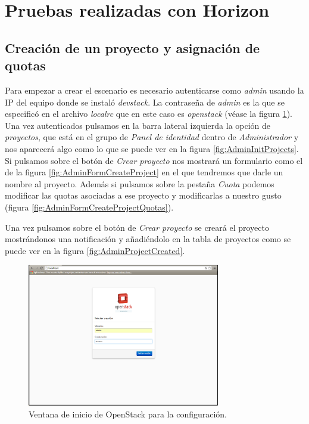 \documentclass{article}
\begin{document}
\section{Pruebas realizadas con Horizon}

\subsection{Creación de un proyecto y asignación de quotas}
	Para empezar a crear el escenario es necesario autenticarse como \emph{admin} usando la IP del equipo donde se instaló \emph{devstack}. La contraseña de \emph{admin} es la que se especificó en el archivo \emph{localrc} que en este caso es \emph{openstack} (véase la figura \ref{fig:AuthAdmin}). Una vez autenticados pulsamos en la barra lateral izquierda  la opción de \emph{proyectos}, que está en el grupo de \emph{Panel de identidad} dentro de \emph{Administrador} y nos aparecerá algo como lo que se puede ver en la figura \ref{fig:AdminInitProjects}. Si pulsamos sobre el botón de \emph{Crear proyecto} nos mostrará un formulario como el de la figura \ref{fig:AdminFormCreateProject} en el que tendremos que darle un nombre al proyecto. Además si pulsamos sobre la pestaña \emph{Cuota} podemos modificar las quotas asociadas a ese proyecto y modificarlas a nuestro gusto (figura \ref{fig:AdminFormCreateProjectQuotas}).
	
	Una vez pulsamos sobre el botón de \emph{Crear proyecto} se creará el proyecto mostrándonos una notificación y añadiéndolo en la tabla de proyectos como se puede ver en la figura \ref{fig:AdminProjectCreated}.
\begin{figure}[h]
  \centering
    \includegraphics[width=0.75\textwidth]{img/m_001.png}
  \caption{Ventana de inicio de OpenStack para la configuración.}
  \label{fig:AuthAdmin}
\end{figure}
\end{document}
